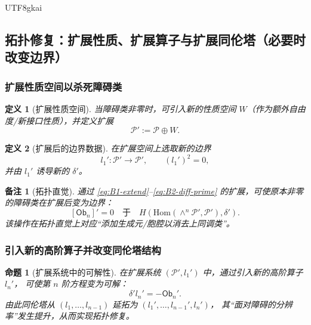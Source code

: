 \documentclass[12pt]{article}
\newtheorem{definition}{定义}[section]
\newtheorem{proposition}{命题}[section]
\newtheorem{remark}{备注}[section]
\newcommand{\Ob}{\ensuremath{\mathsf{Ob}}}
\begin{document}
\begin{CJK*}{UTF8}{gkai}
\subsection{拓扑修复：扩展性质、扩展算子与扩展同伦塔（必要时改变边界）}
\label{subsec:tex18-topological-repair}

\subsubsection{扩展性质空间以杀死障碍类}
\label{subsubsec:tex18-extend-space}

\begin{definition}[扩展性质空间]
当障碍类非零时，可引入新的性质空间 $W$（作为额外自由度/新接口性质），并定义扩展
\begin{equation}
\tag{B1}
\label{eq:B1-extend}
  \mathcal{P}' := \mathcal{P}\oplus W.
\end{equation}
\end{definition}

\begin{definition}[扩展后的边界数据]
在扩展空间上选取新的边界
\begin{equation}
\tag{B2}
\label{eq:B2-diff-prime}
  l_1':\mathcal{P}'\to\mathcal{P}',\qquad (l_1')^2=0,
\end{equation}
并由 $l_1'$ 诱导新的 $\delta'$。
\end{definition}

\begin{remark}[拓扑直觉]
通过 \eqref{eq:B1-extend}--\eqref{eq:B2-diff-prime} 的扩展，可使原本非零的障碍类在扩展后变为边界：
\begin{equation}
\label{eq:B3-ob-killed}
  [\Ob_n]'=0\quad\text{于}\quad H\!\left(\mathrm{Hom}(\wedge^n\mathcal{P}',\mathcal{P}'),\delta'\right).
\end{equation}
该操作在拓扑直觉上对应“添加生成元/胞腔以消去上同调类”。
\end{remark}

\subsubsection{引入新的高阶算子并改变同伦塔结构}
\label{subsubsec:tex18-add-operators}

\begin{proposition}[扩展系统中的可解性]
在扩展系统 $(\mathcal{P}',l_1')$ 中，通过引入新的高阶算子 $l_n'$，
可使第 $n$ 阶方程变为可解：
\begin{equation}
\tag{B4}
\label{eq:B4-level-n-prime}
  \delta' l_n' = -\Ob_n'.
\end{equation}
由此同伦塔从 $(l_1,\dots,l_{n-1})$ 延拓为 $(l_1',\dots,l_{n-1}',l_n')$，
其“面对障碍的分辨率”发生提升，从而实现拓扑修复。
\end{proposition}


\end{CJK*}
\end{document}
